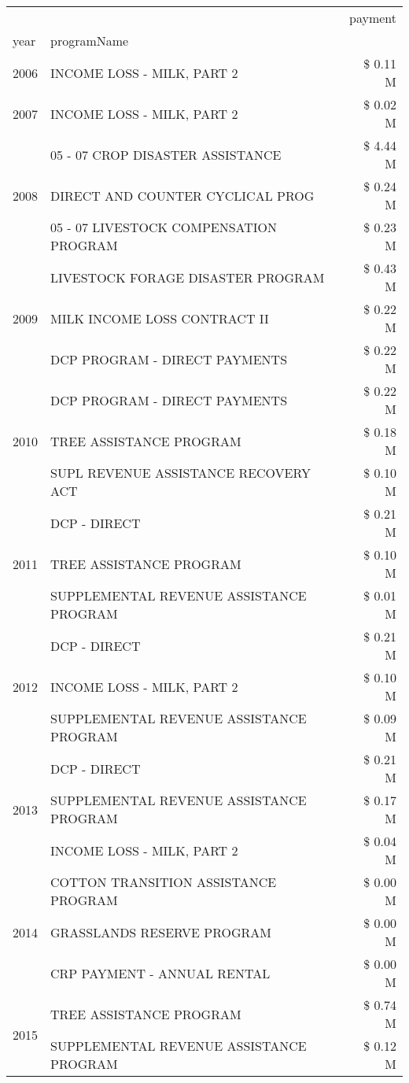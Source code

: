 \begin{tabular}{llr}
\toprule
 &  & payment \\
year & programName &  \\
\midrule
2006 & INCOME LOSS - MILK, PART 2 & \$ 0.11 M \\
\cline{1-3}
2007 & INCOME LOSS - MILK, PART 2 & \$ 0.02 M \\
\cline{1-3}
\multirow[t]{3}{*}{2008} & 05 - 07 CROP DISASTER ASSISTANCE & \$ 4.44 M \\
 & DIRECT AND COUNTER CYCLICAL PROG & \$ 0.24 M \\
 & 05 - 07 LIVESTOCK COMPENSATION PROGRAM & \$ 0.23 M \\
\cline{1-3}
\multirow[t]{3}{*}{2009} & LIVESTOCK FORAGE DISASTER  PROGRAM & \$ 0.43 M \\
 & MILK INCOME LOSS CONTRACT II & \$ 0.22 M \\
 & DCP PROGRAM - DIRECT PAYMENTS & \$ 0.22 M \\
\cline{1-3}
\multirow[t]{3}{*}{2010} & DCP PROGRAM - DIRECT PAYMENTS & \$ 0.22 M \\
 & TREE ASSISTANCE PROGRAM & \$ 0.18 M \\
 & SUPL REVENUE ASSISTANCE RECOVERY ACT & \$ 0.10 M \\
\cline{1-3}
\multirow[t]{3}{*}{2011} & DCP - DIRECT & \$ 0.21 M \\
 & TREE ASSISTANCE PROGRAM & \$ 0.10 M \\
 & SUPPLEMENTAL REVENUE ASSISTANCE PROGRAM & \$ 0.01 M \\
\cline{1-3}
\multirow[t]{3}{*}{2012} & DCP - DIRECT & \$ 0.21 M \\
 & INCOME LOSS - MILK, PART 2 & \$ 0.10 M \\
 & SUPPLEMENTAL REVENUE ASSISTANCE PROGRAM & \$ 0.09 M \\
\cline{1-3}
\multirow[t]{3}{*}{2013} & DCP - DIRECT & \$ 0.21 M \\
 & SUPPLEMENTAL REVENUE ASSISTANCE PROGRAM & \$ 0.17 M \\
 & INCOME LOSS - MILK, PART 2 & \$ 0.04 M \\
\cline{1-3}
\multirow[t]{3}{*}{2014} & COTTON TRANSITION ASSISTANCE PROGRAM & \$ 0.00 M \\
 & GRASSLANDS RESERVE PROGRAM & \$ 0.00 M \\
 & CRP PAYMENT - ANNUAL RENTAL & \$ 0.00 M \\
\cline{1-3}
\multirow[t]{3}{*}{2015} & TREE ASSISTANCE PROGRAM & \$ 0.74 M \\
 & SUPPLEMENTAL REVENUE ASSISTANCE PROGRAM & \$ 0.12 M \\

\end{tabular}
